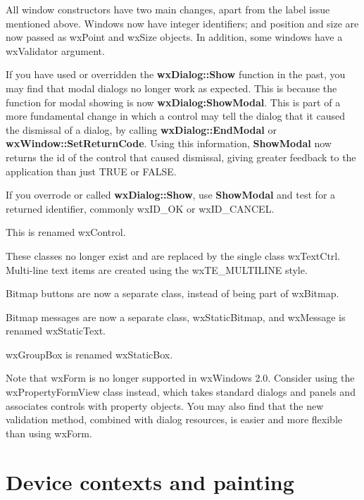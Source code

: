 
All window constructors have two main changes, apart from the label issue mentioned above.
Windows now have integer identifiers; and position and size are now passed as wxPoint and
wxSize objects. In addition, some windows have a wxValidator argument.


If you have used or overridden the {\bf wxDialog::Show} function in the past, you may find
that modal dialogs no longer work as expected. This is because the function for modal showing
is now {\bf wxDialog:ShowModal}. This is part of a more fundamental change in which a
control may tell the dialog that it caused the dismissal of a dialog, by
calling {\bf wxDialog::EndModal} or {\bf wxWindow::SetReturnCode}. Using this
information, {\bf ShowModal} now returns the id of the control that caused dismissal,
giving greater feedback to the application than just TRUE or FALSE.

If you overrode or called {\bf wxDialog::Show}, use {\bf ShowModal} and test for a returned identifier,
commonly wxID\_OK or wxID\_CANCEL.


This is renamed wxControl.


These classes no longer exist and are replaced by the single class wxTextCtrl.
Multi-line text items are created using the wxTE\_MULTILINE style.


Bitmap buttons are now a separate class, instead of being part of wxBitmap.


Bitmap messages are now a separate class, wxStaticBitmap, and wxMessage
is renamed wxStaticText.


wxGroupBox is renamed wxStaticBox.


Note that wxForm is no longer supported in wxWindows 2.0. Consider using the wxPropertyFormView class
instead, which takes standard dialogs and panels and associates controls with property objects.
You may also find that the new validation method, combined with dialog resources, is easier
and more flexible than using wxForm.

\section{Device contexts and painting}\label{portingdc}

